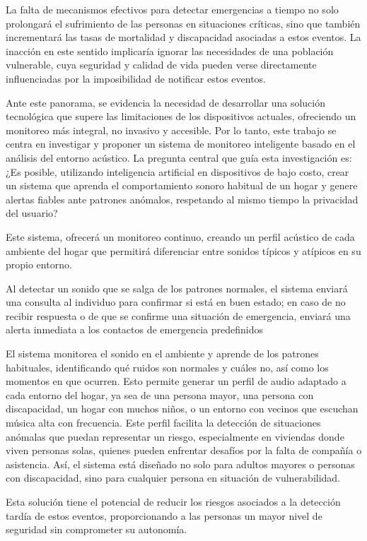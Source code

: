 La falta de mecanismos efectivos para detectar emergencias a tiempo no solo prolongará el sufrimiento de las personas en situaciones críticas, sino que también incrementará las tasas de mortalidad y discapacidad asociadas a estos eventos. La inacción en este sentido implicaría ignorar las necesidades de una población vulnerable, cuya seguridad y calidad de vida pueden verse directamente influenciadas por la imposibilidad de notificar estos eventos.

Ante este panorama, se evidencia la necesidad de desarrollar una solución tecnológica que supere las limitaciones de los dispositivos actuales, ofreciendo un monitoreo más integral, no invasivo y accesible. Por lo tanto, este trabajo se centra en investigar y proponer un sistema de monitoreo inteligente basado en el análisis del entorno acústico. La pregunta central que guía esta investigación es: ¿Es posible, utilizando inteligencia artificial en dispositivos de bajo costo, crear un sistema que aprenda el comportamiento sonoro habitual de un hogar y genere alertas fiables ante patrones anómalos, respetando al mismo tiempo la privacidad del usuario?

Este sistema, ofrecerá un monitoreo continuo, creando un perfil acústico de cada ambiente del hogar que permitirá diferenciar entre sonidos típicos y atípicos en su propio entorno.

Al detectar un sonido que se salga de los patrones normales, el sistema enviará una consulta al individuo para confirmar si está en buen estado; en caso de no recibir respuesta o de que se confirme una situación de emergencia, enviará una alerta inmediata a los contactos de emergencia predefinidos

El sistema monitorea el sonido en el ambiente y aprende de los patrones habituales, identificando qué ruidos son normales y cuáles no, así como los momentos en que ocurren. Esto permite generar un perfil de audio adaptado a cada entorno del hogar, ya sea de una persona mayor, una persona con discapacidad, un hogar con muchos niños, o un entorno con vecinos que escuchan música alta con frecuencia. Este perfil facilita la detección de situaciones anómalas que puedan representar un riesgo, especialmente en viviendas donde viven personas solas, quienes pueden enfrentar desafíos por la falta de compañía o asistencia. Así, el sistema está diseñado no solo para adultos mayores o personas con discapacidad, sino para cualquier persona en situación de vulnerabilidad.

Esta solución tiene el potencial de reducir los riesgos asociados a la detección tardía de estos eventos, proporcionando a las personas un mayor nivel de seguridad sin comprometer su autonomía.

